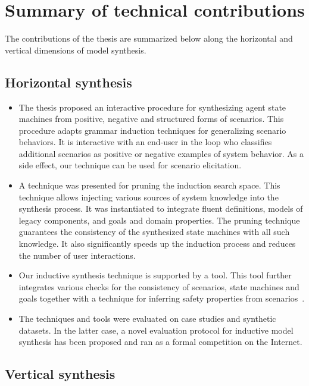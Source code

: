 \section{Summary of technical contributions\label{section:conclusion-contributions}}

The contributions of the thesis are summarized below along the horizontal and vertical dimensions of model synthesis.

\subsection*{Horizontal synthesis}

\begin{itemize}
\item The thesis proposed an interactive procedure for synthesizing agent state machines from positive, negative and structured forms of scenarios. This procedure adapts grammar induction techniques for generalizing scenario behaviors. It is interactive with an end-user in the loop who classifies additional scenarios as positive or negative examples of system behavior. As a side effect, our technique can be used for scenario elicitation.
\item A technique was presented for pruning the induction search space. This technique allows injecting various sources of system knowledge into the synthesis process. It was instantiated to integrate fluent definitions, models of legacy components, and goals and domain properties. The pruning technique guarantees the consistency of the synthesized state machines with all such knowledge. It also significantly speeds up the induction process and reduces the number of user interactions.
\item Our inductive synthesis technique is supported by a tool. This tool further integrates various checks for the consistency of scenarios, state machines and goals together with a technique for inferring safety properties from scenarios~\cite{Damas:2011}. 
\item The techniques and tools were evaluated on case studies and synthetic datasets. In the latter case, a novel evaluation protocol for inductive model synthesis has been proposed and ran as a formal competition on the Internet.
\end{itemize}

\subsection*{Vertical synthesis}

